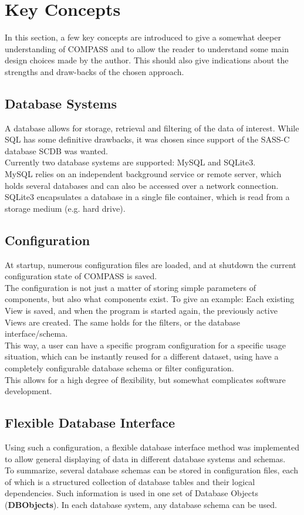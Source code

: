 \section{Key Concepts}
\label{sec:key_concepts}

In this section, a few key concepts are introduced to give a somewhat deeper understanding of COMPASS and to allow the reader to understand some main design choices made by the author. This should also give indications about the strengths and draw-backs of the chosen approach.

\subsection*{Database Systems}
A database allows for storage, retrieval and filtering of the data of interest. While SQL has some definitive drawbacks, it was chosen since support of the SASS-C database SCDB was wanted.\\
Currently  two  database  systems  are  supported: MySQL and SQLite3. \\
MySQL  relies on an independent background service or remote server, which holds several databases and can also be accessed over a network connection.\\
SQLite3 encapsulates a database in a single file container, which is read from a storage medium (e.g. hard drive).

\subsection*{Configuration}
At startup, numerous configuration files are loaded, and at shutdown the current configuration state of COMPASS is saved.\\
The configuration is not just a matter of storing simple parameters of components, but also what components exist. To give an example: Each existing View is saved, and when the program is started again, the previously active Views are created.  The same holds for the filters, or the database interface/schema. \\
This way, a user can have a specific program configuration for a specific usage situation, which can be instantly reused for a different dataset, using have a completely configurable database schema or filter configuration. \\
This allows for a high degree of flexibility, but somewhat complicates software development.

\subsection*{Flexible Database Interface}
Using such a configuration, a flexible database interface method was implemented to allow general displaying of data in different database systems and schemas.\\
To summarize, several database schemas can be stored in configuration files, each of which is a structured collection of database tables and their logical dependencies. Such information is used in one set of Database Objects (\textbf{DBObjects}). In each database system, any database schema can be used.

